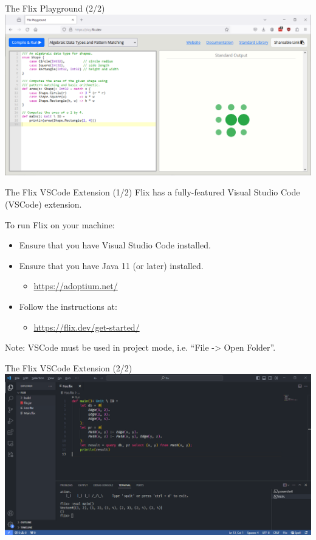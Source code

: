 \begin{frame}{The Flix Playground (2/2)}
\includegraphics[width=\textwidth]{img/flix-playground.png}
\end{frame}

\begin{frame}{The Flix VSCode Extension (1/2)}
Flix has a fully-featured Visual Studio Code (VSCode) extension. 

To run Flix on your machine:
\begin{itemize}
    \item Ensure that you have Visual Studio Code installed.
    \item Ensure that you have Java 11 (or later) installed.
    \begin{itemize}
        \item \url{https://adoptium.net/}
    \end{itemize}
    \item Follow the instructions at:
    \begin{itemize}
        \item \url{https://flix.dev/get-started/}
    \end{itemize}
\end{itemize}

{\small Note: VSCode must be used in project mode, i.e. ``File -> Open Folder''.}
\end{frame}

\begin{frame}{The Flix VSCode Extension (2/2)}
\includegraphics[width=\textwidth]{img/flix-vscode.png}
\end{frame}
    
